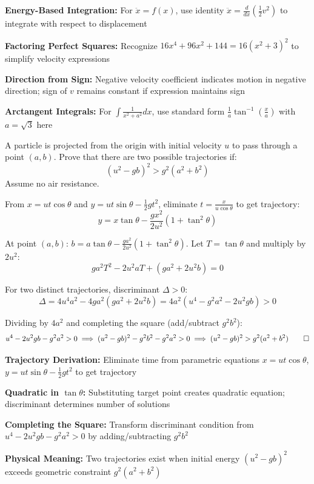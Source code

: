 \begin{takeaways}
\item \textbf{Energy-Based Integration:} For $\ddot{x} = f(x)$, use identity $\ddot{x} = \frac{d}{dx}\left(\frac{1}{2}v^2\right)$ to integrate with respect to displacement
\item \textbf{Factoring Perfect Squares:} Recognize $16x^4 + 96x^2 + 144 = 16(x^2+3)^2$ to simplify velocity expressions
\item \textbf{Direction from Sign:} Negative velocity coefficient indicates motion in negative direction; sign of $v$ remains constant if expression maintains sign
\item \textbf{Arctangent Integrals:} For $\int \frac{1}{x^2+a^2}dx$, use standard form $\frac{1}{a}\tan^{-1}\left(\frac{x}{a}\right)$ with $a = \sqrt{3}$ here
\end{takeaways}

\newpage

\begin{problem}
A particle is projected from the origin with initial velocity $u$ to pass through a point $(a,b)$. Prove that there are two possible trajectories if:
$$ (u^2 - gb)^2 > g^2(a^2 + b^2) $$
Assume no air resistance.
\end{problem}

\begin{solution}
From $x = ut\cos\theta$ and $y = ut\sin\theta - \frac{1}{2}gt^2$, eliminate $t = \frac{x}{u\cos\theta}$ to get trajectory:
\[ y = x\tan\theta - \frac{gx^2}{2u^2}(1 + \tan^2\theta) \]

At point $(a,b)$: $b = a\tan\theta - \frac{ga^2}{2u^2}(1 + \tan^2\theta)$. Let $T = \tan\theta$ and multiply by $2u^2$:
\[ ga^2 T^2 - 2u^2a T + (ga^2 + 2u^2b) = 0 \]

For two distinct trajectories, discriminant $\Delta > 0$:
\[ \Delta = 4u^4a^2 - 4ga^2(ga^2 + 2u^2b) = 4a^2(u^4 - g^2a^2 - 2u^2gb) > 0 \]

Dividing by $4a^2$ and completing the square (add/subtract $g^2b^2$):
\[ u^4 - 2u^2gb - g^2a^2 > 0 \implies (u^2-gb)^2 - g^2b^2 - g^2a^2 > 0 \implies (u^2-gb)^2 > g^2(a^2+b^2) \qed \]
\end{solution}

\begin{takeaways}
\item \textbf{Trajectory Derivation:} Eliminate time from parametric equations $x = ut\cos\theta$, $y = ut\sin\theta - \frac{1}{2}gt^2$ to get trajectory
\item \textbf{Quadratic in $\tan\theta$:} Substituting target point creates quadratic equation; discriminant determines number of solutions
\item \textbf{Completing the Square:} Transform discriminant condition from $u^4 - 2u^2gb - g^2a^2 > 0$ by adding/subtracting $g^2b^2$
\item \textbf{Physical Meaning:} Two trajectories exist when initial energy $(u^2 - gb)^2$ exceeds geometric constraint $g^2(a^2+b^2)$
\end{takeaways}


